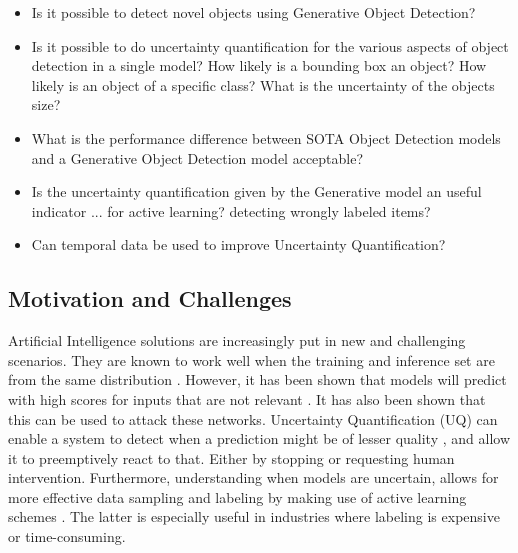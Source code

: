 \begin{itemize}
    \item Is it possible to detect novel objects using Generative Object Detection?
    \item Is it possible to do uncertainty quantification for the various aspects of object detection in a single model?
          \subitem How likely is a bounding box an object?
          \subitem How likely is an object of a specific class?
          \subitem What is the uncertainty of the objects size?
    \item What is the performance difference between SOTA Object Detection models and a Generative Object Detection model acceptable?
    \item Is the uncertainty quantification given by the Generative model an useful indicator ...
          \subitem for active learning?
          \subitem detecting wrongly labeled items?
    \item Can temporal data be used to improve Uncertainty Quantification?
\end{itemize}

\subsection{Motivation and Challenges}

Artificial Intelligence solutions are increasingly put in new and challenging scenarios. They are known to work well when the training and inference set are from the same distribution \cite{krizhevsky2012imagenet}. However, it has been shown that models will predict with high scores for inputs that are not relevant \cite{Nguyen_2015_CVPR,szegedy2013intriguing}. It has also been shown that this can be used to attack these networks\cite{goodfellow2014explaining,dong2018boosting}.
Uncertainty Quantification (UQ) can enable a system to detect when a prediction might be of lesser quality \cite{däubener2020detecting}, and allow it to preemptively react to that\cite{osti_1481629}. Either by stopping or requesting human intervention.
Furthermore, understanding when models are uncertain, allows for more effective data sampling and labeling by making use of active learning schemes \cite{settles2009active,Bernhardt_2022,yang2009effective}. The latter is especially useful in industries where labeling is expensive or time-consuming.

